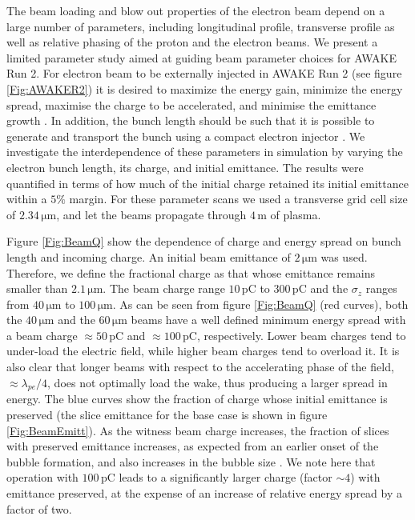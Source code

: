 \documentclass[aps,prstab,reprint,amsmath,amssymb,groupedaddress]{revtex4-1}
\newcommand{\unit}[1]{\,\mathrm{#1}}
\begin{document}
The beam loading and blow out properties of the electron beam depend on a large number of parameters, including
longitudinal profile, transverse profile as well as relative phasing of the proton and the electron beams. We present a
limited parameter study aimed at guiding beam parameter choices for AWAKE Run 2. For electron beam to be externally
injected in AWAKE Run 2 (see figure \ref{Fig:AWAKER2}) it is desired to maximize the energy gain, minimize the energy
spread, maximise the charge to be accelerated, and minimise the emittance growth \cite{adli:2016}. In addition, the
bunch length should be such that it is possible to generate and transport the bunch using a compact electron injector
\cite{adli:2016}. We investigate the interdependence of these parameters in simulation by varying the electron bunch
length, its charge, and initial emittance. The results were quantified in terms of how much of the initial charge
retained its initial emittance within a $5\%$ margin. For these parameter scans we used a transverse grid cell size of
$2.34\unit{\mu m}$, and let the beams propagate through $4\unit{m}$ of plasma.

Figure \ref{Fig:BeamQ}  show the dependence of charge and energy spread on bunch length and incoming charge. An initial
beam emittance of $2\unit{\mu m}$ was used. Therefore, we define the fractional charge as that whose emittance remains
smaller than $2.1\unit{\mu m}$. The beam charge range $10\unit{pC}$ to $300\unit{pC}$ and the $\sigma_{z}$ ranges from
$40\unit{\mu m}$ to $100\unit{\mu m}$. As can be seen from figure \ref{Fig:BeamQ} (red curves), both the
$40\unit{\mu m}$ and the $60\unit{\mu m}$ beams have a well defined minimum energy spread with a beam charge
$\approx 50\unit{pC}$ and $\approx 100\unit{pC}$, respectively. Lower beam charges tend to under-load the electric
field, while higher beam charges tend to overload it. It is also clear that longer beams with respect to the
accelerating phase of the field, $\approx\lambda_{pe}/4$, does not optimally load the wake, thus producing a larger
spread in energy. The blue curves show the fraction of charge whose initial emittance is preserved (the slice emittance
for the base case is shown in figure \ref{Fig:BeamEmitt}). As the witness beam charge increases, the fraction of slices
with preserved emittance increases, as expected from an earlier onset of the bubble formation, and also increases in the
bubble size \cite{lu:2006-1, lu:2006}. We note here that operation with $100\unit{pC}$ leads to a significantly larger
charge (factor $\sim 4$) with emittance preserved, at the expense of an increase of relative energy spread by a factor
of two.
\end{document}

